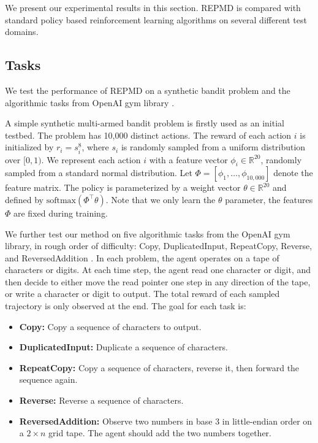 
We present our experimental results in this section. REPMD is compared with standard policy based reinforcement learning algorithms on several different test domains.

\subsection{Tasks}
\label{subsec:tasks}
We test the performance of REPMD on a synthetic bandit problem and the algorithmic tasks from OpenAI gym library \citep{brockman2016openai}.  

A simple synthetic multi-armed bandit problem is firstly used as an initial testbed.
The problem has 10,000 distinct actions. The reward of each action $i$ is initialized by $r_i = s_i^{8}$, where $s_i$ is randomly sampled from a uniform distribution over $[0,1)$. We represent each action $i$ with a feature vector $\phi_i\in \mathbb{R}^{20}$, randomly sampled from a standard normal distribution. Let $\Phi=[\phi_1,\dots,\phi_{10,000}]$ denote the feature matrix. The policy is parameterized by a weight vector $\theta\in  \mathbb{R}^{20}$ and  defined by $\text{softmax}(\Phi^{\top}\theta)$. Note that we only learn the $\theta$ parameter, the features $\Phi$ are fixed during training. 


We further test our method on five algorithmic tasks from the OpenAI gym library, in rough order of difficulty: Copy, DuplicatedInput, RepeatCopy, Reverse, and ReversedAddition \citep{brockman2016openai}. In each problem, the agent operates on a tape of characters or digits. At each time step, the agent read one character or digit, and then decide to either move the read pointer one step in any direction of the tape, or write a character or digit to output. The total reward of each sampled trajectory is only observed at the end. The goal for each task is:
\begin{itemize}
\item \textbf{Copy:} Copy a sequence of characters to output. 
\item \textbf{DuplicatedInput:} Duplicate a sequence of characters.
\item \textbf{RepeatCopy:} Copy a sequence of characters, reverse it, then forward the sequence again. 
\item \textbf{Reverse:} Reverse a sequence of characters.
\item \textbf{ReversedAddition:} Observe two numbers in base 3 in little-endian order on a $2\times n$ grid tape. The agent should add the two numbers together. 
\end{itemize}

